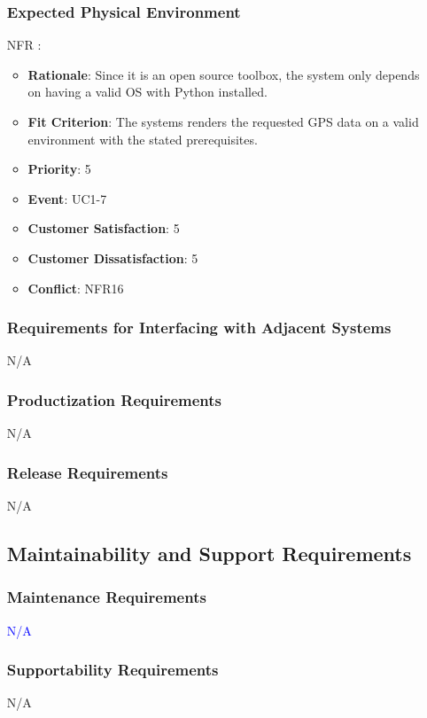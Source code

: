 \documentclass[12pt, titlepage]{article}
\newcounter{reqnum} %
\newcounter{freqnum} %
\begin{document}
\begin{itemize}
\subsubsection{Expected Physical Environment}
\item[NFR\refstepcounter{freqnum}\thefreqnum
\label{NFR}:] 
\begin{itemize}
    \item \textbf{Rationale}: Since it is an open source toolbox, the system only depends on having a valid OS with Python installed.
    \item \textbf{Fit Criterion}: The systems renders the requested GPS data on a valid environment with the stated prerequisites.
    \item \textbf{Priority}: 5
    \item \textbf{Event}: UC1-7%
    \item \textbf{Customer Satisfaction}: 5
    \item \textbf{Customer Dissatisfaction}: 5
    \item \textbf{Conflict}: NFR16
\end{itemize}
\subsubsection{Requirements for Interfacing with Adjacent Systems}
N/A
\subsubsection{Productization Requirements}
N/A
\subsubsection{Release Requirements}
N/A
\subsection{Maintainability and Support Requirements}

\subsubsection{Maintenance Requirements}
\textcolor{blue}{N/A}
\subsubsection{Supportability Requirements}
N/A

\end{itemize}
\end{document}
